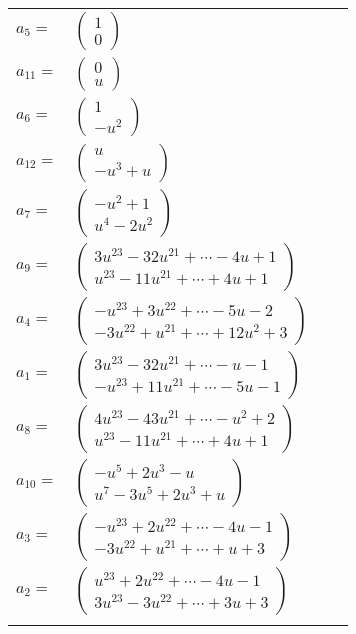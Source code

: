 \documentclass[1p]{elsarticle_modified}
\theoremstyle{definition}
\begin{document}
\begin{tabular}{m{7pt} m{180pt} m{7pt} m{180pt} }
\flushright $a_{5}=$&$\begin{pmatrix}1\\0\end{pmatrix}$ \\
\flushright $a_{11}=$&$\begin{pmatrix}0\\u\end{pmatrix}$ \\
\flushright $a_{6}=$&$\begin{pmatrix}1\\- u^2\end{pmatrix}$ \\
\flushright $a_{12}=$&$\begin{pmatrix}u\\- u^3+u\end{pmatrix}$ \\
\flushright $a_{7}=$&$\begin{pmatrix}- u^2+1\\u^4-2 u^2\end{pmatrix}$ \\
\flushright $a_{9}=$&$\begin{pmatrix}3 u^{23}-32 u^{21}+\cdots-4 u+1\\u^{23}-11 u^{21}+\cdots+4 u+1\end{pmatrix}$ \\
\flushright $a_{4}=$&$\begin{pmatrix}- u^{23}+3 u^{22}+\cdots-5 u-2\\-3 u^{22}+u^{21}+\cdots+12 u^2+3\end{pmatrix}$ \\
\flushright $a_{1}=$&$\begin{pmatrix}3 u^{23}-32 u^{21}+\cdots- u-1\\- u^{23}+11 u^{21}+\cdots-5 u-1\end{pmatrix}$ \\
\flushright $a_{8}=$&$\begin{pmatrix}4 u^{23}-43 u^{21}+\cdots- u^2+2\\u^{23}-11 u^{21}+\cdots+4 u+1\end{pmatrix}$ \\
\flushright $a_{10}=$&$\begin{pmatrix}- u^5+2 u^3- u\\u^7-3 u^5+2 u^3+u\end{pmatrix}$ \\
\flushright $a_{3}=$&$\begin{pmatrix}- u^{23}+2 u^{22}+\cdots-4 u-1\\-3 u^{22}+u^{21}+\cdots+u+3\end{pmatrix}$ \\
\flushright $a_{2}=$&$\begin{pmatrix}u^{23}+2 u^{22}+\cdots-4 u-1\\3 u^{23}-3 u^{22}+\cdots+3 u+3\end{pmatrix}$\\&\end{tabular}
\end{document}
